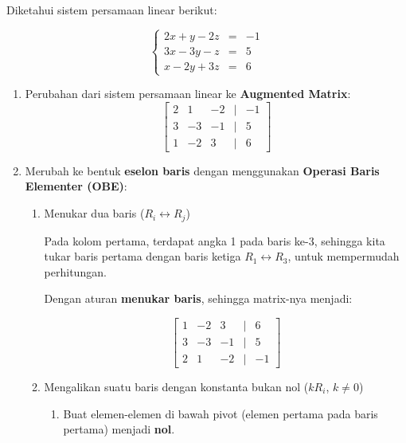 \documentclass{article}
\begin{document}
\pagestyle{empty}
\vspace{1em}

Diketahui sistem persamaan linear berikut:

\[
\left\{
\begin{array}{rcl}
2x + y - 2z &=& -1 \\
3x - 3y - z &=& 5 \\
x - 2y + 3z &=& 6
\end{array}
\right.
\]

\begin{enumerate}
    \item Perubahan dari sistem persamaan linear ke \textbf{Augmented Matrix}:
    \[
    \begin{bmatrix}
    2 & 1 & -2 & \vert & -1 \\
    3 & -3 & -1 & \vert & 5 \\
    1 & -2 & 3 & \vert & 6
    \end{bmatrix}
    \]
    \item Merubah ke bentuk \textbf{eselon baris} dengan menggunakan \textbf{Operasi Baris Elementer (OBE)}:

    \begin{enumerate}
        \item Menukar dua baris (\(R_i \leftrightarrow R_j\))
        
        \vspace{1em}

        Pada kolom pertama, terdapat angka 1 pada baris ke-3, sehingga kita tukar baris pertama dengan baris ketiga \(R_1 \leftrightarrow R_3\), untuk mempermudah perhitungan.

        Dengan aturan \textbf{menukar baris}, sehingga matrix-nya menjadi:

        \[
        \begin{bmatrix}
        1 & -2 & 3 & \vert & 6 \\
        3 & -3 & -1 & \vert & 5 \\
        2 & 1 & -2 & \vert & -1
        \end{bmatrix}
        \]

        \vspace{1em}

        \item Mengalikan suatu baris dengan konstanta bukan nol (\(kR_i\), \(k \neq 0\))
        
        \begin{enumerate}
            \item Buat elemen-elemen di bawah pivot (elemen pertama pada baris pertama) menjadi \textbf{nol}.


\end{enumerate}
\end{enumerate}
\end{enumerate}
\end{document}

